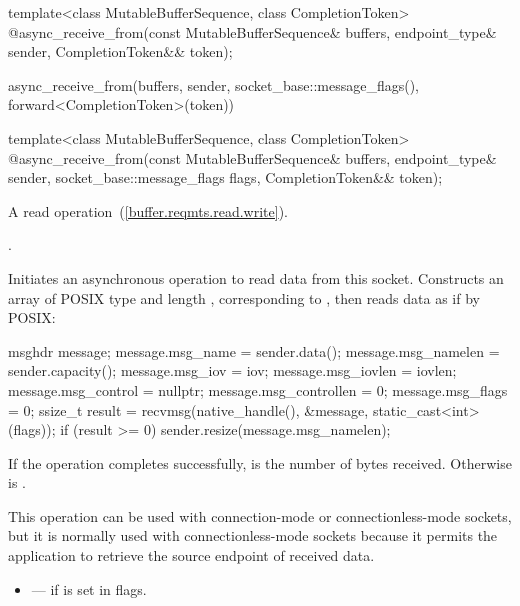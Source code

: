 \begin{itemdecl}
template<class MutableBufferSequence, class CompletionToken>
  @\DEDUCED@ async_receive_from(const MutableBufferSequence& buffers,
                             endpoint_type& sender,
                             CompletionToken&& token);
\end{itemdecl}

\begin{itemdescr}
\pnum
\returns
\begin{codeblock}
async_receive_from(buffers, sender, socket_base::message_flags(),
                   forward<CompletionToken>(token))
\end{codeblock}
\end{itemdescr}

\begin{itemdecl}
template<class MutableBufferSequence, class CompletionToken>
  @\DEDUCED@ async_receive_from(const MutableBufferSequence& buffers,
                             endpoint_type& sender,
                             socket_base::message_flags flags,
                             CompletionToken&& token);
\end{itemdecl}

\begin{itemdescr}
\pnum
A read operation~(\ref{buffer.reqmts.read.write}).

\pnum
\completionsig {}.

\pnum
\effects Initiates an asynchronous operation to read data from this socket. Constructs an array  of POSIX type  and length , corresponding to , then reads data as if by POSIX:
\begin{codeblock}
msghdr message;
message.msg_name = sender.data();
message.msg_namelen = sender.capacity();
message.msg_iov = iov;
message.msg_iovlen = iovlen;
message.msg_control = nullptr;
message.msg_controllen = 0;
message.msg_flags = 0;
ssize_t result = recvmsg(native_handle(), &message, static_cast<int>(flags));
if (result >= 0)
  sender.resize(message.msg_namelen);
\end{codeblock}


\pnum
If the operation completes successfully,  is the number of bytes received. Otherwise  is .

\pnum
 \begin{note} This operation can be used with connection-mode or connectionless-mode sockets, but it is normally used with connectionless-mode sockets because it permits the application to retrieve the source endpoint of received data. \end{note}

\pnum
\errors
\begin{itemize}
\item
{} --- if  is set in flags.
\end{itemize}
\end{itemdescr}

